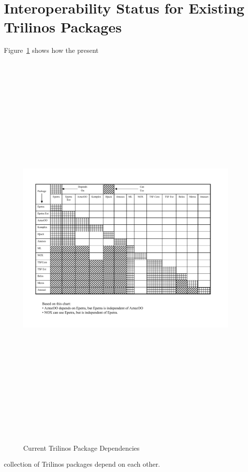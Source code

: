 \documentclass[12pt,strict]{TrilinosDevGuide}
\begin{document}
\section{Interoperability Status for Existing Trilinos Packages}
Figure~\ref{Figure:TrilinosPackageDependencies} shows how the present
\begin{figure}
\includegraphics[height=8in]{TrilinosPackageDependencies}
\label{Figure:TrilinosPackageDependencies}
\caption{Current Trilinos Package Dependencies}
\end{figure}
collection of Trilinos packages depend on each other.

\end{document}
